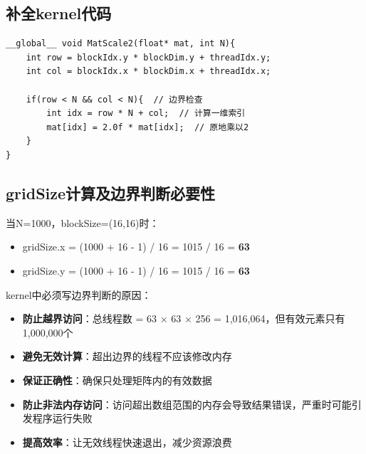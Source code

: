 \subsection{补全kernel代码}

\begin{lstlisting}[style=cleancpp]
__global__ void MatScale2(float* mat, int N){
    int row = blockIdx.y * blockDim.y + threadIdx.y;
    int col = blockIdx.x * blockDim.x + threadIdx.x;
    
    if(row < N && col < N){  // 边界检查
        int idx = row * N + col;  // 计算一维索引
        mat[idx] = 2.0f * mat[idx];  // 原地乘以2
    }
}
\end{lstlisting}

\subsection{gridSize计算及边界判断必要性}

当N=1000，blockSize=(16,16)时：

\begin{itemize}
    \item gridSize.x = (1000 + 16 - 1) / 16 = 1015 / 16 = \textbf{63}
    \item gridSize.y = (1000 + 16 - 1) / 16 = 1015 / 16 = \textbf{63}
\end{itemize}

kernel中必须写边界判断的原因：

\begin{itemize}
    \item \textbf{防止越界访问}：总线程数 = 63 × 63 × 256 = 1,016,064，但有效元素只有1,000,000个
    \item \textbf{避免无效计算}：超出边界的线程不应该修改内存
    \item \textbf{保证正确性}：确保只处理矩阵内的有效数据
    \item \textbf{防止非法内存访问}：访问超出数组范围的内存会导致结果错误，严重时可能引发程序运行失败
    \item \textbf{提高效率}：让无效线程快速退出，减少资源浪费
\end{itemize}
